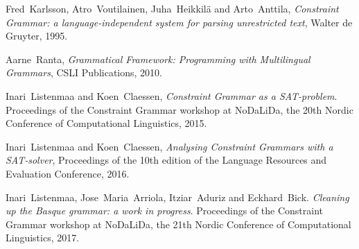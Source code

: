 \documentclass[conference]{IEEEtran}
\begin{document}


%
%
%
\begin{thebibliography}{1}


  Fred~Karlsson,  Atro~Voutilainen, Juha~Heikkil{\"{a}} and Arto~Anttila,
 \emph{Constraint Grammar: a language-independent system for parsing unrestricted text},
Walter de Gruyter, 1995.

  Aarne~Ranta, \emph{Grammatical Framework: Programming with Multilingual Grammars}, 
     CSLI Publications, 2010.

 Inari~Listenmaa and Koen~Claessen, \emph{Constraint Grammar as a SAT-problem}. Proceedings of the Constraint Grammar workshop at NoDaLiDa, the 20th Nordic Conference of Computational Linguistics, 2015.

  Inari~Listenmaa and Koen~Claessen, \emph{Analysing Constraint Grammars with a SAT-solver},
  Proceedings of the 10th edition of the Language Resources and Evaluation Conference, 2016.

  Inari~Listenmaa, Jose~Maria~Arriola, Itziar~Aduriz and Eckhard~Bick. \emph{Cleaning up the Basque grammar: a work in progress}. 
  Proceedings of the Constraint Grammar workshop at NoDaLiDa, the 21th Nordic Conference of Computational Linguistics, 2017.


\end{thebibliography}




\end{document}
